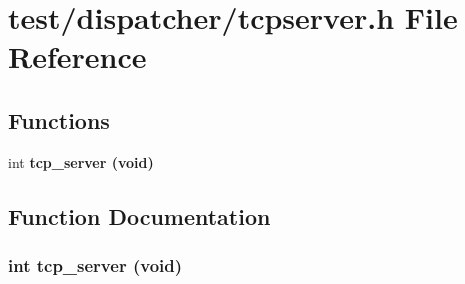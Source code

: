 \section{test/dispatcher/tcpserver.h File Reference}
\label{dispatcher_2tcpserver_8h}
\subsection*{Functions}
\begin{CompactItemize}
\item 
int \bf{tcp\_\-server} (void)
\end{CompactItemize}


\subsection{Function Documentation}
\subsubsection{\setlength{\rightskip}{0pt plus 5cm}int tcp\_\-server (void)}\label{dispatcher_2tcpserver_8h_670df12c784cbf1b260ab50397194b66}


